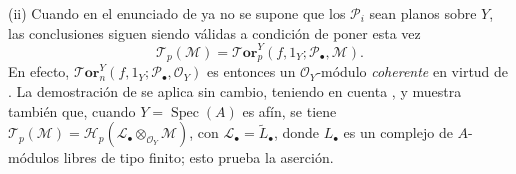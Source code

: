 \begin{remarks}[7.7.12]
\medskip
\textnormal{(ii)} Cuando en el enunciado de  ya no se supone
que los $\mathscr P_i$ sean planos sobre $Y$, las conclusiones siguen siendo
válidas a condición de poner esta vez
\[
  \mathscr T_p(\mathscr M)
  =
  \boldsymbol{\mathscr{T}\!or}^Y_p
    (f,1_Y;\mathscr P_\bullet,\mathscr M).
  \tag{7.7.12.1}\label{III.7.7.12.1.fr}
\]
En efecto,
$\boldsymbol{\mathscr{T}\!or}^Y_n(f,1_Y;\mathscr P_\bullet,\mathscr O_Y)$ es entonces un
$\mathscr O_Y$-módulo \emph{coherente} en virtud de . La
demostración de  se aplica sin cambio, teniendo en cuenta
, y muestra también que, cuando
$Y=\operatorname{Spec}(A)$ es afín, se tiene
$\mathscr T_p(\mathscr M)=\mathscr H_p(\mathscr L_\bullet\otimes_{\mathscr O_Y}\mathscr M)$,
con $\mathscr L_\bullet=\widetilde{L}_\bullet$,
donde $L_\bullet$ es un complejo de $A$-módulos libres de tipo finito; esto
prueba la aserción.
\end{remarks}
